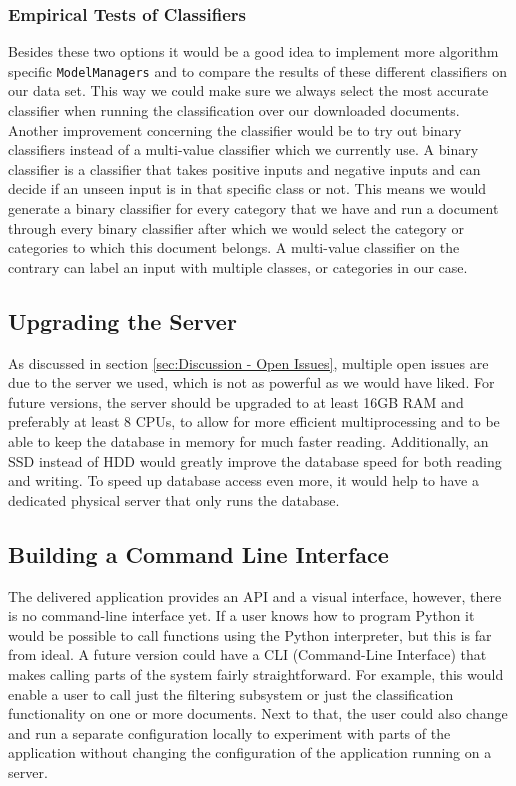 \subsubsection{Empirical Tests of Classifiers}
Besides these two options it would be a good idea to implement more algorithm specific \texttt{ModelManagers} and to compare the results of these different classifiers on our data set. This way we could make sure we always select the most accurate classifier when running the classification over our downloaded documents.\\
Another improvement concerning the classifier would be to try out binary classifiers instead of a multi-value classifier which we currently use. A binary classifier is a classifier that takes positive inputs and negative inputs and can decide if an unseen input is in that specific class or not. This means we would generate a binary classifier for every category that we have and run a document through every binary classifier after which we would select the category or categories to which this document belongs. A multi-value classifier on the contrary can label an input with multiple classes, or categories in our case\cite{hess2008multi}.  

\subsection{Upgrading the Server}
As discussed in section \ref{sec:Discussion - Open Issues}, multiple open issues are due to the server we used, which is not as powerful as we would have liked. For future versions, the server should be upgraded to at least 16GB RAM and preferably at least 8 CPUs, to allow for more efficient multiprocessing and to be able to keep the database in memory for much faster reading. Additionally, an SSD instead of HDD would greatly improve the database speed for both reading and writing. To speed up database access even more, it would help to have a dedicated physical server that only runs the database.

\subsection{Building a Command Line Interface}
The delivered application provides an API and a visual interface, however, there is no command-line interface yet. If a user knows how to program Python it would be possible to call functions using the Python interpreter, but this is far from ideal. A future version could have a CLI (Command-Line Interface) that makes calling parts of the system fairly straightforward. For example, this would enable a user to call just the filtering subsystem or just the classification functionality on one or more documents. Next to that, the user could also change and run a separate configuration locally to experiment with parts of the application without changing the configuration of the application running on a server.

